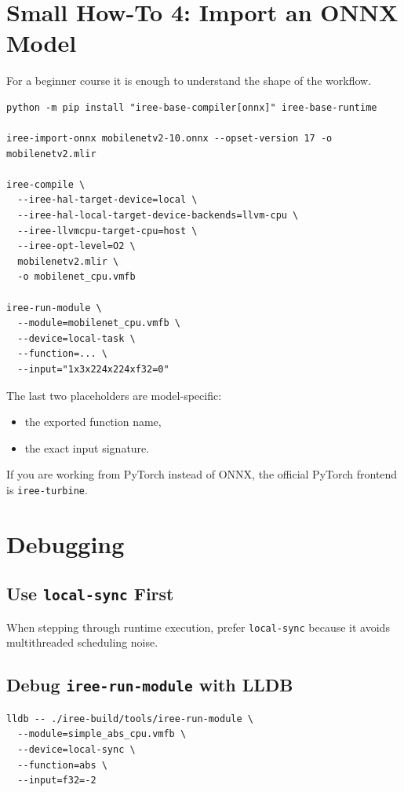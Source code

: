 \documentclass[11pt,a4paper]{article}
\begin{document}
\section{Small How-To 4: Import an ONNX Model}

For a beginner course it is enough to understand the shape of the workflow.

\begin{lstlisting}[caption=Import ONNX, compile, and run on CPU]
python -m pip install "iree-base-compiler[onnx]" iree-base-runtime

iree-import-onnx mobilenetv2-10.onnx --opset-version 17 -o mobilenetv2.mlir

iree-compile \
  --iree-hal-target-device=local \
  --iree-hal-local-target-device-backends=llvm-cpu \
  --iree-llvmcpu-target-cpu=host \
  --iree-opt-level=O2 \
  mobilenetv2.mlir \
  -o mobilenet_cpu.vmfb

iree-run-module \
  --module=mobilenet_cpu.vmfb \
  --device=local-task \
  --function=... \
  --input="1x3x224x224xf32=0"
\end{lstlisting}

The last two placeholders are model-specific:
\begin{itemize}
    \item the exported function name,
    \item the exact input signature.
\end{itemize}

If you are working from PyTorch instead of ONNX, the official PyTorch frontend is \texttt{iree-turbine}.

\section{Debugging}

\subsection{Use \texttt{local-sync} First}

When stepping through runtime execution, prefer \texttt{local-sync} because it avoids multithreaded scheduling noise.

\subsection{Debug \texttt{iree-run-module} with LLDB}

\begin{lstlisting}[caption=Launch the runtime under LLDB]
lldb -- ./iree-build/tools/iree-run-module \
  --module=simple_abs_cpu.vmfb \
  --device=local-sync \
  --function=abs \
  --input=f32=-2
\end{lstlisting}
\end{document}
